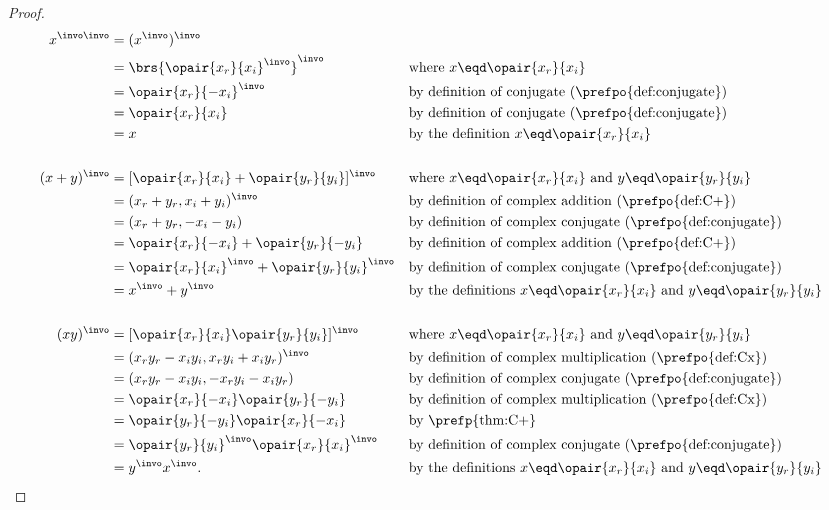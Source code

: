 \begin{proof}
\begin{align*}
   x^{\invo\invo}
     &= (x^\invo)^\invo
   \\&= \brs{\opair{x_r}{x_i}^\invo}^\invo
    && \text{where $x\eqd\opair{x_r}{x_i}$}
   \\&= \opair{x_r}{-x_i}^\invo
    && \text{by definition of conjugate (\prefpo{def:conjugate})}
   \\&= \opair{x_r}{x_i}
    && \text{by definition of conjugate (\prefpo{def:conjugate})}
   \\&= x
    && \text{by the definition $x\eqd\opair{x_r}{x_i}$}
\\
\\
   (x+y)^\invo
     &= [\opair{x_r}{x_i} + \opair{y_r}{y_i}]^\invo
    && \text{where $x\eqd\opair{x_r}{x_i}$ and $y\eqd\opair{y_r}{y_i}$}
   \\&= (x_r+y_r,x_i+y_i)^\invo
     && \text{by definition of complex addition (\prefpo{def:C+})}
   \\&= (x_r+y_r,-x_i-y_i)
     && \text{by definition of complex conjugate (\prefpo{def:conjugate})}
   \\&= \opair{x_r}{-x_i} + \opair{y_r}{-y_i}
     && \text{by definition of complex addition (\prefpo{def:C+})}
   \\&= \opair{x_r}{x_i}^\invo + \opair{y_r}{y_i}^\invo
     && \text{by definition of complex conjugate (\prefpo{def:conjugate})}
   \\&= x^\invo + y^\invo
     && \text{by the definitions $x\eqd\opair{x_r}{x_i}$ and $y\eqd\opair{y_r}{y_i}$}
\\
\\
   (xy)^\invo
     &= [\opair{x_r}{x_i}\opair{y_r}{y_i}]^\invo
    && \text{where $x\eqd\opair{x_r}{x_i}$ and $y\eqd\opair{y_r}{y_i}$}
   \\&= (x_ry_r-x_iy_i, x_ry_i+x_iy_r)^\invo
     && \text{by definition of complex multiplication (\prefpo{def:Cx})}
   \\&= (x_ry_r-x_iy_i, -x_ry_i-x_iy_r)
     && \text{by definition of complex conjugate (\prefpo{def:conjugate})}
   \\&= \opair{x_r}{-x_i}\opair{y_r}{-y_i}
     && \text{by definition of complex multiplication (\prefpo{def:Cx})}
   \\&= \opair{y_r}{-y_i}\opair{x_r}{-x_i}
     && \text{by \prefp{thm:C+}}
   \\&= \opair{y_r}{y_i}^\invo \opair{x_r}{x_i}^\invo
     && \text{by definition of complex conjugate (\prefpo{def:conjugate})}
   \\&= y^\invo x^\invo.
     && \text{by the definitions $x\eqd\opair{x_r}{x_i}$ and $y\eqd\opair{y_r}{y_i}$}
\end{align*}
\end{proof}



